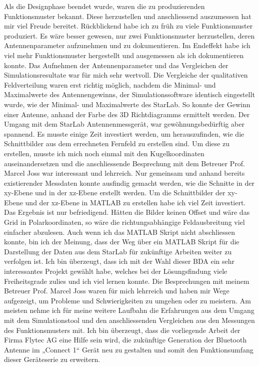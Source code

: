 Als die Designphase beendet wurde, waren die zu produzierenden Funktionsmuster bekannt. Diese herzustellen und anschliessend auszumessen hat mir viel Freude bereitet. Rückblickend habe ich zu früh zu viele Funktionsmuster produziert. Es wäre besser gewesen, nur zwei Funktionsmuster herzustellen, deren Antennenparameter aufzunehmen und zu dokumentieren. Im Endeffekt habe ich viel mehr Funktionsmuster hergestellt und ausgemessen als ich dokumentieren konnte.
Das Aufnehmen der Antennenparameter und das Vergleichen der Simulationsresultate war für mich sehr wertvoll. Die Vergleiche der qualitativen Feldverteilung waren erst richtig möglich, nachdem die Minimal- und Maximalwerte des Antennengewinns, der Simulationssoftware identisch eingestellt wurde, wie der Minimal- und Maximalwerte des StarLab. So konnte der Gewinn einer Antenne, anhand der Farbe des 3D Richtdiagramms ermittelt werden. Der Umgang mit dem StarLab Antennenmessgerät, war gewöhnungsbedürftig aber spannend. Es musste einige Zeit investiert werden, um herauszufinden, wie die Schnittbilder aus dem errechneten Fernfeld zu erstellen sind. Um diese zu erstellen, musste ich mich noch einmal mit den Kugelkoordinaten auseinandersetzen und die anschliessende Besprechung mit dem Betreuer  Prof. Marcel Joss war interessant und lehrreich. Nur gemeinsam und anhand bereits existierender Messdaten konnte ausfindig gemacht werden, wie die Schnitte in der xy-Ebene und in der xz-Ebene erstellt werden. Um die Schnittbilder der xy-Ebene und der xz-Ebene in MATLAB zu erstellen habe ich viel Zeit investiert. Das Ergebnis ist nur befriedigend. Hätten die Bilder keinen Offset und wäre das Grid in Polarkoordinaten, so wäre die richtungsabhängige Feldausbreitung viel einfacher abzulesen. Auch wenn ich das MATLAB Skript nicht abschliessen konnte, bin ich der Meinung, dass der Weg über ein MATLAB Skript für die Darstellung der Daten aus dem StarLab für zukünftige Arbeiten weiter zu verfolgen ist.  
Ich bin überzeugt, dass ich mit der Wahl dieser BDA ein sehr interessantes Projekt gewählt habe, welches bei der Lösungsfindung viele Freiheitsgrade zulies und ich viel  lernen konnte. Die Besprechungen mit meinem Betreuer Prof. Marcel Joss waren für mich lehrreich und haben mir Wege aufgezeigt, um Probleme und Schwierigkeiten zu umgehen oder zu meistern. Am meisten nehme ich für meine weitere Laufbahn die Erfahrungen aus dem Umgang mit dem Simulationstool und den anschliessenden Vergleichen aus den Messungen des Funktionsmusters mit.
Ich bin überzeugt, dass die vorliegende Arbeit der Firma Flytec AG eine Hilfe sein wird, die zukünftige Generation der Bluetooth Antenne im „Connect 1“ Gerät neu zu gestalten und somit den Funktionsumfang dieser Geräteserie zu erweitern.

